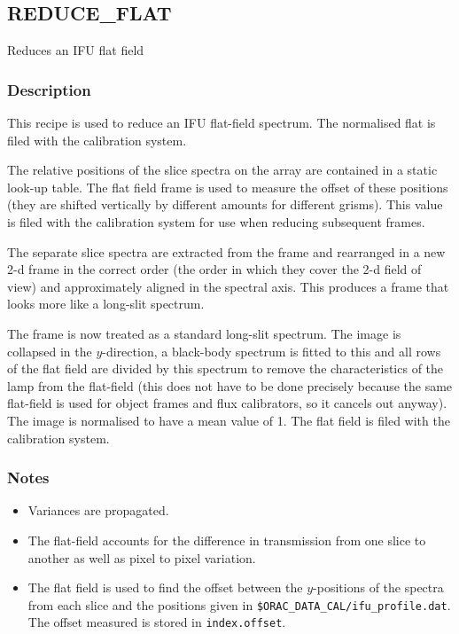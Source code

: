 \documentclass[twoside,11pt,nolof]{starlink}
\begin{document}
\clearpage


\subsection{REDUCE\_FLAT}

Reduces an IFU flat field

\subsubsection*{Description}

This recipe is used to reduce an IFU flat-field spectrum. The
normalised flat is filed with the calibration system.

The relative positions of the slice spectra on the array are contained
in a static look-up table. The flat field frame is used to measure the
offset of these positions (they are shifted vertically by different
amounts for different grisms). This value is filed with the calibration
system for use when reducing subsequent frames.

The separate slice spectra are extracted from the frame and rearranged
in a new 2-d frame in the correct order (the order in which they cover
the 2-d field of view) and approximately aligned in the spectral axis. This
produces a frame that looks more like a long-slit spectrum.

The frame is now treated as a standard long-slit spectrum. The image
is collapsed in the $y$-direction, a black-body spectrum is fitted to
this and all rows of the flat field are divided by this spectrum to
remove the characteristics of the lamp from the flat-field (this does
not have to be done precisely because the same flat-field is used for
object frames and flux calibrators, so it cancels out anyway). The
image is normalised to have a mean value of 1.  The flat field is
filed with the calibration system.




\subsubsection*{Notes}
\begin{itemize}

\item

Variances are propagated.

\item

The flat-field accounts for the difference in transmission from one
slice to another as well as pixel to pixel variation.

\item

  The flat field is used to find the offset between the $y$-positions
  of the spectra from each slice and the positions given in \texttt{\$ORAC\_DATA\_CAL/ifu\_profile.dat}. The offset measured is stored
  in \texttt{index.offset}.

\end{itemize}
\end{document}
